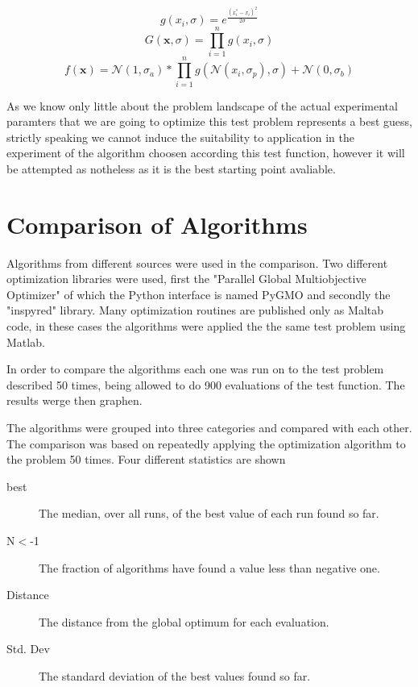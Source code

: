 \documentclass[a4paper,titlepage]{report}
\begin{document}
\[g(x_i,\sigma) = e^{\frac{(x_i^*-x_i)^2}{2\sigma}}\]
\[G(\mathbf{x},\sigma) = \prod_{i=1}^n g(x_i, \sigma)\]
\[f(\mathbf{x}) =  \mathcal{N}(1,\sigma_a) * \prod_{i=1}^n g(\mathcal{N}(x_i,\sigma_p), \sigma) + \mathcal{N}(0,\sigma_b) \]

As we know only little about the problem landscape of the actual experimental paramters that we are going to optimize this test problem represents a best guess, strictly speaking we cannot induce the suitability to application in the experiment of the algorithm choosen according this test function, however it will be attempted as notheless as it is the best starting point avaliable.


\section{Comparison of Algorithms}

Algorithms from different sources were used in the comparison. Two different optimization libraries were used, first the  "Parallel Global Multiobjective Optimizer"\cite{pygmo} of which the Python interface is named PyGMO and secondly the "inspyred"\cite{inspyred} library. Many optimization routines are published only as Maltab code, in these cases the algorithms were applied the the same test problem using Matlab.

In order to compare the algorithms each one was run on to the test problem described 50 times, being allowed to do 900 evaluations of the test function. The results werge then graphen. 



The algorithms were grouped into three categories and compared with each other. The comparison was based on repeatedly applying the optimization algorithm to the problem 50 times. Four different statistics are shown 

\begin{description}
\item[best] The median, over all runs, of the best value of each run found so far.
\item[N$<$-1] The fraction of algorithms have found a value less than negative one.
\item[Distance] The distance from the global optimum for each evaluation.
\item[Std. Dev] The standard deviation of the best values found so far.

\end{description}
\end{document}
